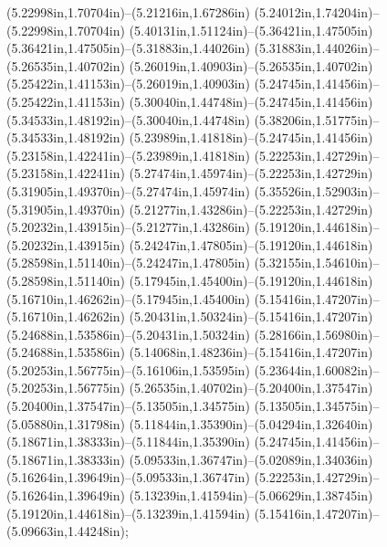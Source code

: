 (5.22998in,1.70704in)--(5.21216in,1.67286in) (5.24012in,1.74204in)--(5.22998in,1.70704in) (5.40131in,1.51124in)--(5.36421in,1.47505in) (5.36421in,1.47505in)--(5.31883in,1.44026in) (5.31883in,1.44026in)--(5.26535in,1.40702in) (5.26019in,1.40903in)--(5.26535in,1.40702in) (5.25422in,1.41153in)--(5.26019in,1.40903in) (5.24745in,1.41456in)--(5.25422in,1.41153in) (5.30040in,1.44748in)--(5.24745in,1.41456in) (5.34533in,1.48192in)--(5.30040in,1.44748in) (5.38206in,1.51775in)--(5.34533in,1.48192in) (5.23989in,1.41818in)--(5.24745in,1.41456in) (5.23158in,1.42241in)--(5.23989in,1.41818in) (5.22253in,1.42729in)--(5.23158in,1.42241in) (5.27474in,1.45974in)--(5.22253in,1.42729in) (5.31905in,1.49370in)--(5.27474in,1.45974in) (5.35526in,1.52903in)--(5.31905in,1.49370in) (5.21277in,1.43286in)--(5.22253in,1.42729in) (5.20232in,1.43915in)--(5.21277in,1.43286in) (5.19120in,1.44618in)--(5.20232in,1.43915in) (5.24247in,1.47805in)--(5.19120in,1.44618in) (5.28598in,1.51140in)--(5.24247in,1.47805in) (5.32155in,1.54610in)--(5.28598in,1.51140in) (5.17945in,1.45400in)--(5.19120in,1.44618in) (5.16710in,1.46262in)--(5.17945in,1.45400in) (5.15416in,1.47207in)--(5.16710in,1.46262in) (5.20431in,1.50324in)--(5.15416in,1.47207in) (5.24688in,1.53586in)--(5.20431in,1.50324in) (5.28166in,1.56980in)--(5.24688in,1.53586in) (5.14068in,1.48236in)--(5.15416in,1.47207in) (5.20253in,1.56775in)--(5.16106in,1.53595in) (5.23644in,1.60082in)--(5.20253in,1.56775in) (5.26535in,1.40702in)--(5.20400in,1.37547in) (5.20400in,1.37547in)--(5.13505in,1.34575in) (5.13505in,1.34575in)--(5.05880in,1.31798in) (5.11844in,1.35390in)--(5.04294in,1.32640in) (5.18671in,1.38333in)--(5.11844in,1.35390in) (5.24745in,1.41456in)--(5.18671in,1.38333in) (5.09533in,1.36747in)--(5.02089in,1.34036in) (5.16264in,1.39649in)--(5.09533in,1.36747in) (5.22253in,1.42729in)--(5.16264in,1.39649in) (5.13239in,1.41594in)--(5.06629in,1.38745in) (5.19120in,1.44618in)--(5.13239in,1.41594in) (5.15416in,1.47207in)--(5.09663in,1.44248in);
